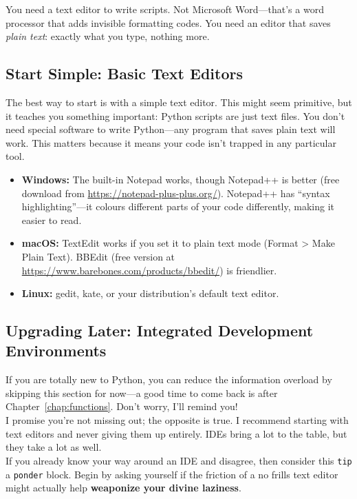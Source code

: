 You need a text editor to write scripts. Not Microsoft Word---that's a word processor that adds invisible formatting codes. You need an editor that saves \emph{plain text}: exactly what you type, nothing more.

\subsection{Start Simple: Basic Text Editors}

The best way to start is with a simple text editor. This might seem primitive, but it teaches you something important: Python scripts are just text files. You don't need special software to write Python---any program that saves plain text will work. This matters because it means your code isn't trapped in any particular tool.

\begin{itemize}
    \item \textbf{Windows:} The built-in Notepad works, though Notepad++ is better (free download from \url{https://notepad-plus-plus.org/}). Notepad++ has ``syntax highlighting''---it colours different parts of your code differently, making it easier to read.
    \item \textbf{macOS:} TextEdit works if you set it to plain text mode (Format > Make Plain Text). BBEdit (free version at \url{https://www.barebones.com/products/bbedit/}) is friendlier.
    \item \textbf{Linux:} gedit, kate, or your distribution's default text editor.
\end{itemize}

\subsection{Upgrading Later: Integrated Development Environments}
\label{subsec:ide}

\begin{tip}
If you are totally new to Python, you can reduce the information overload by skipping this section for now---a good time to come back is after Chapter~\ref{chap:functions}. Don't worry, I'll remind you! \\

I promise you're not missing out; the opposite is true. I recommend starting with text editors and never giving them up entirely. IDEs bring a lot to the table, but they take a lot as well. \\

If you already know your way around an IDE and disagree, then consider this \texttt{tip} a \texttt{ponder} block. Begin by asking yourself if the friction of a no frills text editor might actually help \textbf{weaponize your divine laziness}.

\end{tip}

